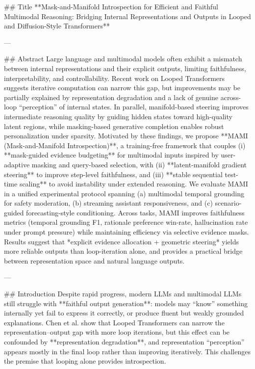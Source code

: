 ## Title  
**Mask-and-Manifold Introspection for Efficient and Faithful Multimodal Reasoning: Bridging Internal Representations and Outputs in Looped and Diffusion-Style Transformers**

---

## Abstract  
Large language and multimodal models often exhibit a mismatch between internal representations and their explicit outputs, limiting faithfulness, interpretability, and controllability. Recent work on Looped Transformers suggests iterative computation can narrow this gap, but improvements may be partially explained by representation degradation and a lack of genuine across-loop “perception” of internal states. In parallel, manifold-based steering improves intermediate reasoning quality by guiding hidden states toward high-quality latent regions, while masking-based generative completion enables robust personalization under sparsity. Motivated by these findings, we propose **MAMI (Mask-and-Manifold Introspection)**, a training-free framework that couples (i) **mask-guided evidence budgeting** for multimodal inputs inspired by user-adaptive masking and query-based selection, with (ii) **latent-manifold gradient steering** to improve step-level faithfulness, and (iii) **stable sequential test-time scaling** to avoid instability under extended reasoning. We evaluate MAMI in a unified experimental protocol spanning (a) multimodal temporal grounding for safety moderation, (b) streaming assistant responsiveness, and (c) scenario-guided forecasting-style conditioning. Across tasks, MAMI improves faithfulness metrics (temporal grounding F1, rationale preference win-rate, hallucination rate under prompt pressure) while maintaining efficiency via selective evidence masks. Results suggest that *explicit evidence allocation + geometric steering* yields more reliable outputs than loop-iteration alone, and provides a practical bridge between representation space and natural language outputs.

---

## Introduction  
Despite rapid progress, modern LLMs and multimodal LLMs still struggle with **faithful output generation**: models may “know” something internally yet fail to express it correctly, or produce fluent but weakly grounded explanations. Chen et al. show that Looped Transformers can narrow the representation–output gap with more loop iterations, but this effect can be confounded by **representation degradation**, and representation “perception” appears mostly in the final loop rather than improving iteratively. This challenges the premise that looping alone provides introspection.

